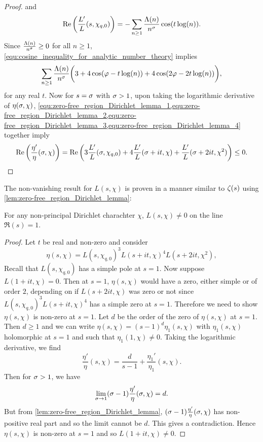 \begin{proof}
        and
        \begin{equation}\label{equ:zero-free_region_Dirichlet_lemma_3}
          \mathrm{Re}\left(\frac{L'}{L}(s,\chi_{q,0})\right) = -\sum_{n \ge 1}\frac{\Lambda(n)}{n^{\sigma}}\cos(t\log(n)).
        \end{equation}
        Since $\frac{\Lambda(n)}{n^{\sigma}} \ge 0$ for all $n \ge 1$, \cref{equ:cosine_inequality_for_analytic_number_theory} implies
        \begin{equation}\label{equ:zero-free_region_Dirichlet_lemma_4}
          \sum_{n \ge 1}\frac{\Lambda(n)}{n^{\sigma}}\bigg(3+4\cos(\varphi-t\log(n))+4\cos(2\varphi-2t\log(n))\bigg),
        \end{equation}
        for any real $t$. Now for $s = \sigma$ with $\sigma > 1$, upon taking the logarithmic derivative of $\eta(\sigma,\chi)$, \cref{equ:zero-free_region_Dirichlet_lemma_1,equ:zero-free_region_Dirichlet_lemma_2,equ:zero-free_region_Dirichlet_lemma_3,equ:zero-free_region_Dirichlet_lemma_4} together imply
        \[
          \mathrm{Re}\left(\frac{\eta'}{\eta}(\sigma,\chi)\right) = \mathrm{Re}\left(3\frac{L'}{L}(\sigma,\chi_{q,0})+4\frac{L'}{L}(\sigma+it,\chi)+\frac{L'}{L}(\sigma+2it,\chi^{2})\right) \le 0.
        \]
      \end{proof}

      The non-vanishing result for $L(s,\chi)$ is proven in a manner similar to $\zeta(s)$ using \cref{lem:zero-free_region_Dirichlet_lemma}:

      \begin{theorem}\label{thm:non-vanishing_of_Dirichlet_on_Re(s)=1}
        For any non-principal Dirichlet charachter $\chi$, $L(s,\chi) \neq 0$ on the line $\Re(s) = 1$.
      \end{theorem}
      \begin{proof}
        Let $t$ be real and non-zero and consider
        \[
          \eta(s,\chi) = L(s,\chi_{q,0})^{3}L(s+it,\chi)^{4}L(s+2it,\chi^{2}),
        \]
        Recall that $L(s,\chi_{q,0})$ has a simple pole at $s = 1$. Now suppose $L(1+it,\chi) = 0$. Then at $s = 1$, $\eta(s,\chi)$ would have a zero, either simple or of order $2$, depending on if $L(s+2it,\chi)$ was zero or not since $L(s,\chi_{q,0})^{3}L(s+it,\chi)^{4}$ has a simple zero at $s = 1$. Therefore we need to show $\eta(s,\chi)$ is non-zero at $s = 1$. Let $d$ be the order of the zero of $\eta(s,\chi)$ at $s = 1$. Then $d \ge 1$ and we can write $\eta(s,\chi) = (s-1)^{d}\eta_{1}(s,\chi)$ with $\eta_{1}(s,\chi)$ holomorphic at $s = 1$ and such that $\eta_{1}(1,\chi) \neq 0$. Taking the logarithmic derivative, we find
        \[
          \frac{\eta'}{\eta}(s,\chi) = \frac{d}{s-1}+\frac{\eta_{1}'}{\eta_{1}}(s,\chi).
        \]
        Then for $\sigma > 1$, we have
        \[
          \lim_{\sigma \to 1}(\sigma-1)\frac{\eta'}{\eta}(\sigma,\chi) = d.
        \]
        But from \cref{lem:zero-free_region_Dirichlet_lemma}, $(\sigma-1)\frac{\eta'}{\eta}(\sigma,\chi)$ has non-positive real part and so the limit cannot be $d$. This gives a contradiction. Hence $\eta(s,\chi)$ is non-zero at $s = 1$ and so $L(1+it,\chi) \neq 0$.
      \end{proof}
